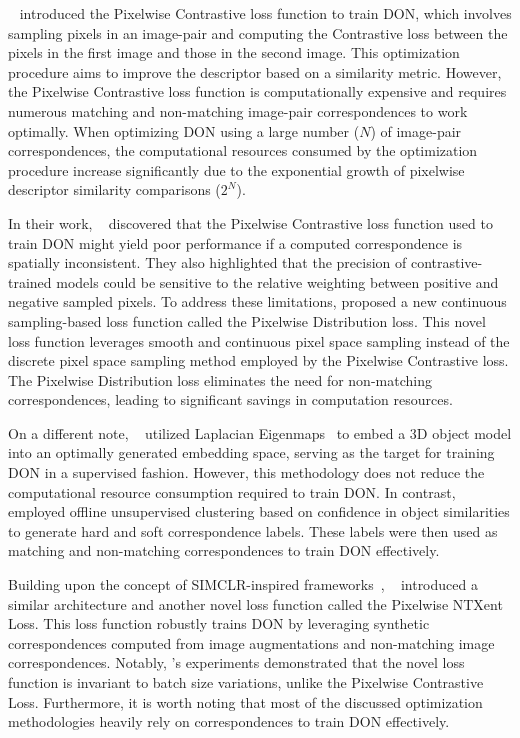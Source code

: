 ~\cite{florence2018dense} introduced the Pixelwise Contrastive loss function to train DON,
which involves sampling pixels in an image-pair and computing the Contrastive loss between the pixels in the first image
and those in the second image. This optimization procedure aims to improve the descriptor based on a similarity metric.
However, the Pixelwise Contrastive loss function is computationally expensive and requires numerous matching and non-matching
image-pair correspondences to work optimally. When optimizing DON using a large number ($N$) of image-pair correspondences,
the computational resources consumed by the optimization procedure increase significantly due to the exponential growth of
pixelwise descriptor similarity comparisons ($2^N$).

In their work, \citeauthor{florence2020dense}~\cite{florence2020dense} discovered that the Pixelwise Contrastive loss
function used to train DON might yield poor performance if a computed correspondence is spatially inconsistent.
They also highlighted that the precision of contrastive-trained models could be sensitive to the relative weighting
between positive and negative sampled pixels. To address these limitations, \citeauthor{florence2020dense}
proposed a new continuous sampling-based loss function called the Pixelwise Distribution loss. This novel
loss function leverages smooth and continuous pixel space sampling instead of the discrete pixel space
sampling method employed by the Pixelwise Contrastive loss. The Pixelwise Distribution loss eliminates
the need for non-matching correspondences, leading to significant savings in computation resources.

On a different note, \citeauthor{kupcsik2021supervised}~\cite{kupcsik2021supervised} utilized Laplacian Eigenmaps~\cite{belkin2003laplacian}
to embed a 3D object model into an optimally generated embedding space, serving as the target for training DON in a supervised fashion.
However, this methodology does not reduce the computational resource consumption required to train DON. In contrast,
\citeauthor{hadjivelichkov2021fully}~\cite{hadjivelichkov2021fully} employed offline unsupervised clustering based on confidence
in object similarities to generate hard and soft correspondence labels. These labels were then used as matching and non-matching
correspondences to train DON effectively.

Building upon the concept of SIMCLR-inspired frameworks~\parencites{chen2020simple}{zbontar2021barlow},
\citeauthor{adrian2022efficient}~\cite{adrian2022efficient} introduced a similar architecture and another
novel loss function called the Pixelwise NTXent Loss. This loss function robustly trains DON by leveraging
synthetic correspondences computed from image augmentations and non-matching image correspondences.
Notably, \citeauthor{adrian2022efficient}'s experiments demonstrated that the novel loss function is
invariant to batch size variations, unlike the Pixelwise Contrastive Loss. Furthermore, it is worth
noting that most of the discussed optimization methodologies heavily rely on correspondences to train DON effectively.

